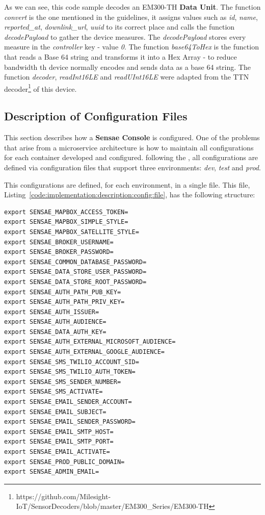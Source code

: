 As we can see, this code sample decodes an EM300-TH \textbf{Data Unit}. The function \textit{convert} is the one mentioned in the guidelines, it assigns values such as \textit{id}, \textit{name}, \textit{reported\_at}, \textit{downlink\_url}, \textit{uuid} to its correct place and calls the function \textit{decodePayload} to gather the device measures. The \textit{decodePayload} stores every measure in the \textit{controller} key - value \textit{0}. The function \textit{base64ToHex} is the function that reads a Base 64 string and transforms it into a Hex Array - to reduce bandwidth th device normally encodes and sends data as a base 64 string. The function \textit{decoder}, \textit{readInt16LE} and \textit{readUInt16LE} were adapted from the TTN decoder\footnote{https://github.com/Milesight-IoT/SensorDecoders/blob/master/EM300\_Series/EM300-TH} of this device.

\subsection{Description of Configuration Files}
\label{subsec:implementation:description:config}

This section describes how a \textbf{Sensae Console} is configured. One of the problems that arise from a microservice architecture is how to maintain all configurations for each container developed and configured. following the , all configurations are defined via configuration files that support three environments: \textit{dev}, \textit{test} and \textit{prod}.

This configurations are defined, for each environment, in a single file. This file, Listing~\ref{code:implementation:description:config:file}, has the following structure:

\begin{lstlisting}[caption=Configuration File for Production Environment, label={code:implementation:description:config:file}]
export SENSAE_MAPBOX_ACCESS_TOKEN=
export SENSAE_MAPBOX_SIMPLE_STYLE=
export SENSAE_MAPBOX_SATELLITE_STYLE=
export SENSAE_BROKER_USERNAME=
export SENSAE_BROKER_PASSWORD=
export SENSAE_COMMON_DATABASE_PASSWORD=
export SENSAE_DATA_STORE_USER_PASSWORD=
export SENSAE_DATA_STORE_ROOT_PASSWORD=
export SENSAE_AUTH_PATH_PUB_KEY=
export SENSAE_AUTH_PATH_PRIV_KEY=
export SENSAE_AUTH_ISSUER=
export SENSAE_AUTH_AUDIENCE=
export SENSAE_DATA_AUTH_KEY=
export SENSAE_AUTH_EXTERNAL_MICROSOFT_AUDIENCE=
export SENSAE_AUTH_EXTERNAL_GOOGLE_AUDIENCE=
export SENSAE_SMS_TWILIO_ACCOUNT_SID=
export SENSAE_SMS_TWILIO_AUTH_TOKEN=
export SENSAE_SMS_SENDER_NUMBER=
export SENSAE_SMS_ACTIVATE=
export SENSAE_EMAIL_SENDER_ACCOUNT=
export SENSAE_EMAIL_SUBJECT=
export SENSAE_EMAIL_SENDER_PASSWORD=
export SENSAE_EMAIL_SMTP_HOST=
export SENSAE_EMAIL_SMTP_PORT=
export SENSAE_EMAIL_ACTIVATE=
export SENSAE_PROD_PUBLIC_DOMAIN=
export SENSAE_ADMIN_EMAIL=
\end{lstlisting}


